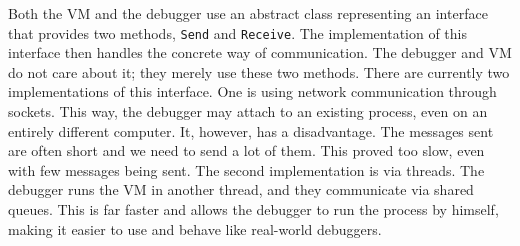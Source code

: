 Both the VM and the debugger use an abstract class representing an interface
that provides two methods, \texttt{Send} and \texttt{Receive}. The
implementation of this interface then handles the concrete way of
communication. The debugger and VM do not care about it; they merely use these
two methods. There are currently two implementations of this interface. One is
using network communication through sockets. This way, the debugger may attach
to an existing process, even on an entirely different computer. It, however,
has a disadvantage. The messages sent are often short and we need to send a lot
of them. This proved too slow, even with few messages being sent. The second
implementation is via threads. The debugger runs the VM in another thread, and
they communicate via shared queues. This is far faster and allows the debugger
to run the process by himself, making it easier to use and behave like
real-world debuggers.

